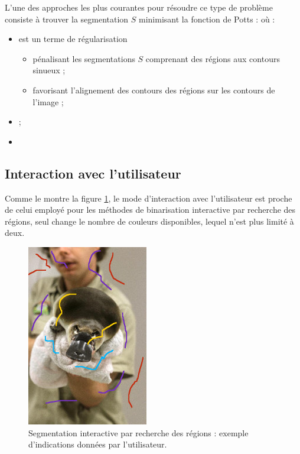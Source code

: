 L'une des approches les plus courantes pour résoudre ce type de problème consiste à trouver la segmentation $S$ minimisant la fonction de Potts : 
où :
\begin{itemize}
\item {} est un terme de régularisation
\begin{itemize}
\item  pénalisant les segmentations $S$ comprenant des régions aux contours sinueux ;
\item favorisant l'alignement des contours des régions sur les contours de l'image ;
\end{itemize}
\item {};
\item {}
\end{itemize}

\subsection{Interaction avec l'utilisateur}

Comme le montre la figure \ref{fig:sota_region-based-method-mc-ihm}, le mode d'interaction avec l'utilisateur est proche de celui employé pour les méthodes de binarisation interactive par recherche des régions, seul change le nombre de couleurs disponibles, lequel n'est plus limité à deux.

\begin{figure}[htb]
	\centering
			\includegraphics[height=0.35\textheight]{images/etat-de-l-art/region-based-method-mc}
		 \caption{Segmentation interactive  par recherche des régions : exemple d'indications données par l'utilisateur.}
		 \label{fig:sota_region-based-method-mc-ihm}
\end{figure}




